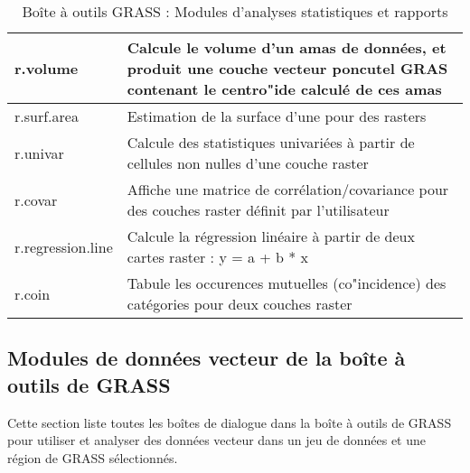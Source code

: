 \begin{table}[H]
\begin{tabular}{|p{4cm}|p{10cm}|}
  \hline r.volume & Calcule le volume d'un amas de données, et produit une couche vecteur poncutel GRAS contenant le centro"ide calculé de ces amas \\
  \hline r.surf.area & Estimation de la surface d'une pour des rasters \\
  \hline r.univar & Calcule des statistiques univariées à partir de cellules non nulles d'une couche raster\\
  \hline r.covar & Affiche une matrice de corrélation/covariance pour des couches raster définit par l'utilisateur\\
  \hline r.regression.line & Calcule la régression linéaire à partir de deux cartes raster : y = a + b * x \\
  \hline r.coin & Tabule les occurences mutuelles (co"incidence) des catégories pour deux couches raster\\
\hline
\end{tabular}
\caption{Boîte à outils GRASS : Modules d'analyses statistiques et rapports}
\end{table}


\subsection{Modules de données vecteur de la boîte à outils de GRASS}

Cette section liste toutes les boîtes de dialogue dans la boîte à outils de GRASS pour utiliser et analyser des données vecteur dans un jeu de données et une région de GRASS sélectionnés.


